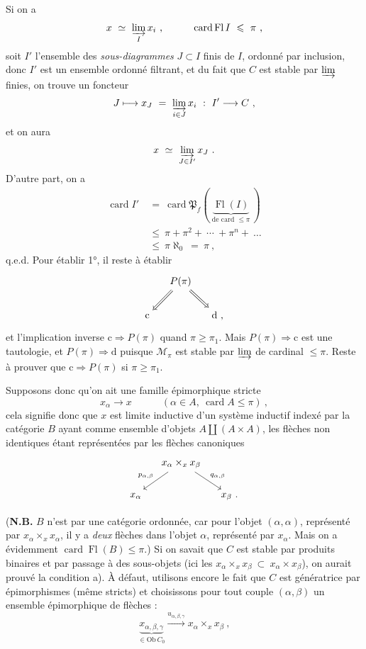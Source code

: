 \documentclass[11pt]{article}
\newcommand{\printedpage}[1]{\if\relax\detokenize{#1}\relax\else\marginpar{\footnotesize p.~#1}\fi}
\newcommand{\msp}[1]{\marginpar{\footnotesize [#1]}}
\newcommand{\Ob}{\mathrm{Ob}\,}
\newcommand{\card}{\operatorname{card}}
\newcommand{\Fl}{\operatorname{Fl}}
\begin{document}
\printedpage{40}

\msp{page 129}
Si on a
\[ x \ \simeq \ \varinjlim_{I} x_i \ , \qquad\quad \card \Fl I \ \leqslant \ \pi \ , \]
soit $I'$ l'ensemble des \textit{sous-diagrammes} $J \subset I$ finis de $I$, ordonné par inclusion, donc $I'$ est un ensemble ordonné filtrant, et du fait que $C$ est stable par $\varinjlim$ finies, on trouve un foncteur
\[ J \longmapsto x_J \ = \ \varinjlim_{i\in J} x_i \ : \ I' \longrightarrow C \ , \]
et on aura
\[ x \ \simeq \ \varinjlim_{J\in I'} x_J \ . \]
D'autre part, on a
\[
\begin{aligned}
\card I' \ &= \ \card \mathfrak{P}_f( \ \underbrace{\Fl(I)}_{\text{de card $\leqslant \pi$}} \ ) \\
&\leqslant \ \pi + \pi^2 + \ \cdots \ + \pi^n + \ \dots \\
&\leqslant \ \pi\aleph_0 \ = \ \pi \ ,
\end{aligned}
\]
q.e.d. Pour établir 1°, il reste à établir
\[
\begin{tikzcd}[column sep=small]
& P(\pi) \arrow[dl, Rightarrow] \arrow[dr, Rightarrow] & \\
\mathrm{c} & & \mathrm{d} \text{ ,}
\end{tikzcd}
\]
et l'implication inverse $\mathrm{c} \Longrightarrow P(\pi)$ quand $\pi \geqslant \pi_1$. Mais $P(\pi) \Longrightarrow \mathrm{c}$ est une tautologie, et $P(\pi) \Longrightarrow \mathrm{d}$ puisque $\mathcal{M}_{\pi}$ est stable par $\varinjlim$ de cardinal $\leqslant \pi$. Reste à prouver que $\mathrm{c} \Longrightarrow P(\pi)$ si $\pi \geqslant \pi_1$.

\msp{page 130}
Supposons donc qu'on ait une famille épimorphique stricte
\[ x_{\alpha} \longrightarrow x \qquad\quad (\alpha \in A,\ \card A \leqslant \pi) \ , \]
cela signifie donc que $x$ est limite inductive d'un système inductif indexé par la catégorie $B$ ayant comme ensemble d'objets $A \amalg (A\times A)$, les flèches non identiques étant représentées par les flèches canoniques
\[
\begin{tikzcd}[column sep=small]
& x_{\alpha} \times_x x_{\beta} \arrow[dl, "p_{\alpha,\beta}"'] \arrow[dr, "q_{\alpha,\beta}"] & \\
x_{\alpha} & & x_{\beta} \text{ .}
\end{tikzcd}
\]

(\textbf{N.B.} $B$ n'est par une catégorie ordonnée, car pour l'objet $(\alpha,\alpha)$, représenté par $x_{\alpha}\times_x x_{\alpha}$, %
il y a \textit{deux} flèches dans l'objet $\alpha$, représenté par $x_{\alpha}$. Mais on a évidemment $\card \Fl(B) \leqslant \pi$.) Si on savait que $C$ est stable par produits binaires et par passage à des sous-objets (ici les $x_{\alpha} \times_x x_{\beta} \ \subset \ x_{\alpha} \times x_{\beta}$), on aurait prouvé la condition a). À défaut, utilisons encore le fait que $C$ est génératrice par épimorphismes (même stricts) et choisissons pour tout couple $(\alpha,\beta)$ un ensemble épimorphique de flèches :
\[ \underbrace{x_{\alpha,\beta,\gamma}}_{\in \Ob C_0} \xrightarrow{u_{\alpha,\beta,\gamma}} x_{\alpha} \times_x x_{\beta} \ , \]
\end{document}
